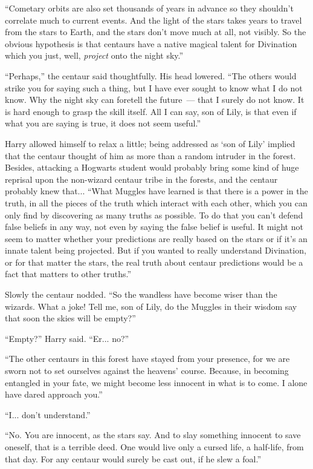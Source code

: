 ``Cometary orbits are also set thousands of years in advance so they shouldn't correlate much to current events. And the light of the stars takes years to travel from the stars to Earth, and the stars don't move much at all, not visibly. So the obvious hypothesis is that centaurs have a native magical talent for Divination which you just, well, \emph{project} onto the night sky.''

``Perhaps,'' the centaur said thoughtfully. His head lowered. ``The others would strike you for saying such a thing, but I have ever sought to know what I do not know. Why the night sky can foretell the future~--- that I surely do not know. It is hard enough to grasp the skill itself. All I can say, son of Lily, is that even if what you are saying is true, it does not seem useful.''

Harry allowed himself to relax a little; being addressed as `son of Lily' implied that the centaur thought of him as more than a random intruder in the forest. Besides, attacking a Hogwarts student would probably bring some kind of huge reprisal upon the non-wizard centaur tribe in the forests, and the centaur probably knew that... ``What Muggles have learned is that there is a power in the truth, in all the pieces of the truth which interact with each other, which you can only find by discovering as many truths as possible. To do that you can't defend false beliefs in any way, not even by saying the false belief is useful. It might not seem to matter whether your predictions are really based on the stars or if it's an innate talent being projected. But if you wanted to really understand Divination, or for that matter the stars, the real truth about centaur predictions would be a fact that matters to other truths.''

Slowly the centaur nodded. ``So the wandless have become wiser than the wizards. What a joke! Tell me, son of Lily, do the Muggles in their wisdom say that soon the skies will be empty?''

``Empty?'' Harry said. ``Er... no?''

``The other centaurs in this forest have stayed from your presence, for we are sworn not to set ourselves against the heavens' course. Because, in becoming entangled in your fate, we might become less innocent in what is to come. I alone have dared approach you.''

``I... don't understand.''

``No. You are innocent, as the stars say. And to slay something innocent to save oneself, that is a terrible deed. One would live only a cursed life, a half-life, from that day. For any centaur would surely be cast out, if he slew a foal.''

